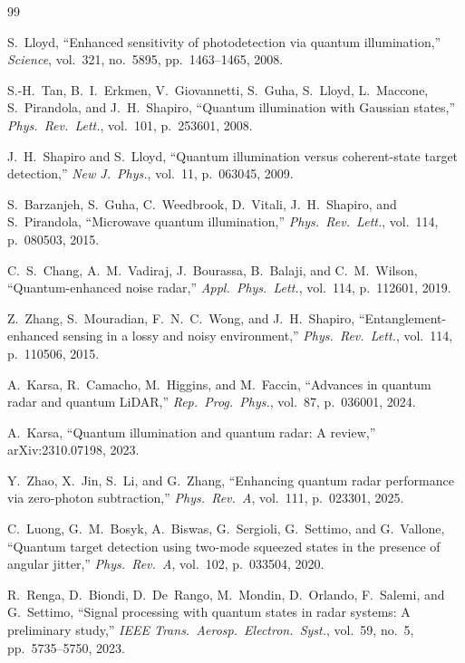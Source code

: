 \documentclass[journal]{IEEEtran}
\begin{document}
\begin{thebibliography}{99}

S.~Lloyd, ``Enhanced sensitivity of photodetection via quantum illumination,'' \textit{Science}, vol.~321, no.~5895, pp.~1463--1465, 2008.

S.-H.~Tan, B.~I.~Erkmen, V.~Giovannetti, S.~Guha, S.~Lloyd, L.~Maccone, S.~Pirandola, and J.~H.~Shapiro, ``Quantum illumination with Gaussian states,'' \textit{Phys.\ Rev.\ Lett.}, vol.~101, p.~253601, 2008.

J.~H.~Shapiro and S.~Lloyd, ``Quantum illumination versus coherent-state target detection,'' \textit{New J.\ Phys.}, vol.~11, p.~063045, 2009.

S.~Barzanjeh, S.~Guha, C.~Weedbrook, D.~Vitali, J.~H.~Shapiro, and S.~Pirandola, ``Microwave quantum illumination,'' \textit{Phys.\ Rev.\ Lett.}, vol.~114, p.~080503, 2015.

C.~S.~Chang, A.~M.~Vadiraj, J.~Bourassa, B.~Balaji, and C.~M.~Wilson, ``Quantum-enhanced noise radar,'' \textit{Appl.\ Phys.\ Lett.}, vol.~114, p.~112601, 2019.

Z.~Zhang, S.~Mouradian, F.~N.~C.~Wong, and J.~H.~Shapiro, ``Entanglement-enhanced sensing in a lossy and noisy environment,'' \textit{Phys.\ Rev.\ Lett.}, vol.~114, p.~110506, 2015.

A.~Karsa, R.~Camacho, M.~Higgins, and M.~Faccin, ``Advances in quantum radar and quantum LiDAR,'' \textit{Rep.\ Prog.\ Phys.}, vol.~87, p.~036001, 2024.

A.~Karsa, ``Quantum illumination and quantum radar: A review,'' arXiv:2310.07198, 2023.

Y.~Zhao, X.~Jin, S.~Li, and G.~Zhang, ``Enhancing quantum radar performance via zero-photon subtraction,'' \textit{Phys.\ Rev.\ A}, vol.~111, p.~023301, 2025.

C.~Luong, G.~M.~Bosyk, A.~Biswas, G.~Sergioli, G.~Settimo, and G.~Vallone, ``Quantum target detection using two-mode squeezed states in the presence of angular jitter,'' \textit{Phys.\ Rev.\ A}, vol.~102, p.~033504, 2020.

R.~Renga, D.~Biondi, D.~De~Rango, M.~Mondin, D.~Orlando, F.~Salemi, and G.~Settimo, ``Signal processing with quantum states in radar systems: A preliminary study,'' \textit{IEEE Trans.\ Aerosp.\ Electron.\ Syst.}, vol.~59, no.~5, pp.~5735--5750, 2023.


\end{thebibliography}
\end{document}
